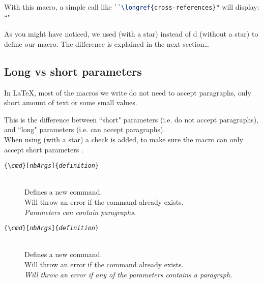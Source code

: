 

With this macro, a simple call like \lstinline[language=tex]|``\longref{cross-references}"|
will display: ``" \\



\bigskip

As you might have noticed, we used  (with a star) instead of d  (without a star) to define our macro. The difference is explained in the next section\dots


\bigskip


\subsection{Long vs short parameters}

In \LaTeX, most of the macros we write do not need to accept paragraphs, only short amount of text or some small values.

This is the difference between ``short" parameters (i.e. do not accept paragraphs), and ``long" parameters (i.e. can accept paragraphs). \\

When using  (with a star) a check is added, to make sure the macro can only accept short parameters .


\begin{description}
	\item[\texttt{\{\textbackslash \emph{cmd}\}[\emph{nbArgs}]\{\emph{definition}\}}] \mbox{} \\
	Defines a new command. \\
	Will throw an error if the command already exists.   \\
	\emph{Parameters can contain paragraphs.}
	
	\item[\texttt{\{\textbackslash \emph{cmd}\}[\emph{nbArgs}]\{\emph{definition}\}}] \mbox{} \\
	Defines a new command.  \\
	Will throw an error if the command already exists. \\
	\emph{Will throw an error if \emph{any} of the parameters contains a paragraph.}
\end{description}





